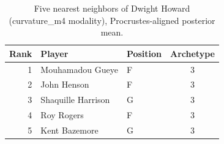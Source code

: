 \begin{table}[htbp]
  \centering\small
  \begin{tabular}{rllc}
    \toprule
    Rank & Player & Position & Archetype \\
    \midrule
    1 & Mouhamadou Gueye & F & 3 \\
    2 & John Henson & F & 3 \\
    3 & Shaquille Harrison & G & 3 \\
    4 & Roy Rogers & F & 3 \\
    5 & Kent Bazemore & G & 3 \\
    \bottomrule
  \end{tabular}
  \caption{Five nearest neighbors of Dwight Howard (curvature_m4 modality), Procrustes-aligned posterior mean.}
  \label{tab:Dwight_Howard_neighbors_curvature_m4}
\end{table}

